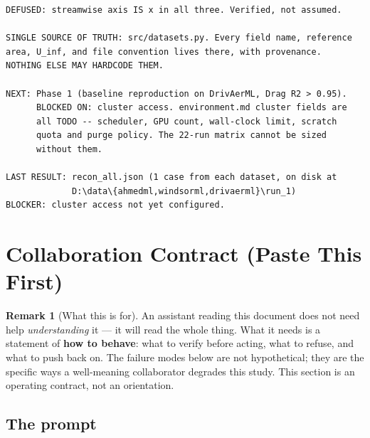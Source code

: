 \documentclass[10pt,a4paper]{article}
\theoremstyle{definition}
\newtheorem{remark}{Remark}[section]
\begin{document}
\begin{lstlisting}[style=sh]
DEFUSED: streamwise axis IS x in all three. Verified, not assumed.

SINGLE SOURCE OF TRUTH: src/datasets.py. Every field name, reference
area, U_inf, and file convention lives there, with provenance.
NOTHING ELSE MAY HARDCODE THEM.

NEXT: Phase 1 (baseline reproduction on DrivAerML, Drag R2 > 0.95).
      BLOCKED ON: cluster access. environment.md cluster fields are
      all TODO -- scheduler, GPU count, wall-clock limit, scratch
      quota and purge policy. The 22-run matrix cannot be sized
      without them.

LAST RESULT: recon_all.json (1 case from each dataset, on disk at
             D:\data\{ahmedml,windsorml,drivaerml}\run_1)
BLOCKER: cluster access not yet configured.
\end{lstlisting}

\section{Collaboration Contract (Paste This First)}
\label{sec:contract}

\begin{remark}[What this is for]
An assistant reading this document does not need help \emph{understanding} it --- it
will read the whole thing. What it needs is a statement of \textbf{how to behave}: what
to verify before acting, what to refuse, and what to push back on. The failure modes
below are not hypothetical; they are the specific ways a well-meaning collaborator
degrades this study. This section is an operating contract, not an orientation.
\end{remark}

\subsection{The prompt}
\end{document}

